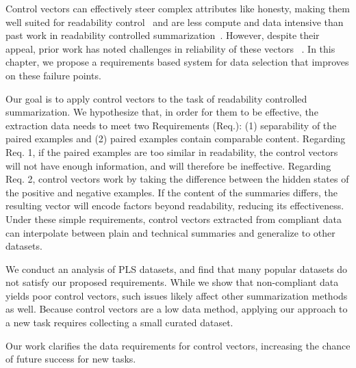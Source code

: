 

Control vectors can effectively steer complex attributes like honesty, making them well suited for readability control~\cite{zou2025representationengineeringtopdownapproach, rimsky-etal-2024-steering} and are less compute and data intensive than past work in readability controlled summarization~\cite{ribeiro-etal-2023-generating}. %
However, despite their appeal, prior work has noted challenges in reliability of these vectors ~\parencite{vonrutte2024languagemodelsguidelatent, stickland2024steeringeffectsimprovingpostdeployment, 10.5555/3737916.3742333, braun2025understandingunreliabilitysteeringvectors}. In this chapter, we propose a requirements based system for data selection that improves on these failure points.



Our goal is to apply control vectors to the task of readability controlled summarization. We hypothesize that, in order for them to be effective, the extraction data needs to meet two Requirements (Req.): (1) separability of the paired examples and (2) paired examples contain comparable content. Regarding Req. 1, if the paired examples are too similar in readability, the control vectors will not have enough information, and will therefore be ineffective. Regarding Req. 2, control vectors work by taking the difference between the hidden states of the positive and negative examples. If the content of the summaries differs, the resulting vector will encode factors beyond readability, reducing its effectiveness. 
Under these simple requirements, control vectors extracted from compliant data can interpolate between plain and technical summaries and generalize to other datasets.

We conduct an analysis of PLS datasets, and find that many popular datasets do not satisfy our proposed requirements. While we show that non-compliant data yields poor control vectors, such issues likely affect other summarization methods as well. Because control vectors are a low data method, applying our approach to a new task requires collecting a small curated dataset.

Our work clarifies the data requirements for control vectors, increasing the chance of future success for new tasks. 